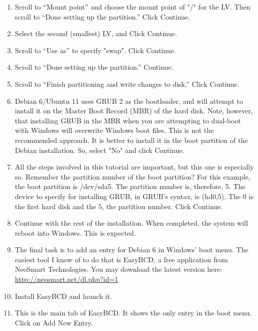 \documentclass[12pt,notitlepage,onecolumn,oneside,openany]{memoir}
\begin{document}
\begin{enumerate}
\item \textsf{Scroll to “Mount point” and choose the mount point of "/" for the LV. Then scroll to “Done setting up the partition.” Click Continue.} 

\item \textsf{Select the second (smallest) LV, and Click Continue.} 

\item \textsf{Scroll to “Use as” to specify "swap". Click Continue.}

\item \textsf{Scroll to “Done setting up the partition.” Continue.} 

\item \textsf{Scroll to “Finish partitioning and write changes to disk.”  Click Continue.} 

\item \textsf{Debian 6/Ubuntu 11 uses GRUB 2 as the bootloader, and will attempt to install it on the Master Boot Record (MBR) of the hard disk. Note, however, that installing GRUB in the MBR when you are attempting to dual-boot with Windows will overwrite Windows boot files. This is not the recommended approach. It is better to install it in the boot partition of the Debian installation. So, select "No" and click Continue.} 

\item \textsf{All the steps involved in this tutorial are important, but this one is especially so. Remember the partition number of the boot partition? For this example, the boot partition is /dev/sda5. The partition number is, therefore, 5. The device to specify for installing GRUB, in GRUB’s syntax, is (hd0,5). The 0 is the first hard disk and the 5, the partition number. Click Continue.}

\item \textsf{Continue with the rest of the installation. When completed, the system will reboot into Windows. This is expected.}
 
\item \textsf{The final task is to add an entry for Debian 6 in Windows’ boot menu. The easiest tool I know of to do that is EasyBCD, a free application from NeoSmart Technologies. You may download the latest version here:} \newline 
      \url{http://neosmart.net/dl.php?id=1} 
      
\item \textsf{Install EasyBCD and launch it.}
 
\item \textsf{This is the main tab of EasyBCD. It shows the only entry in the boot menu. Click on Add New Entry.} 


\end{enumerate}
\end{document}
